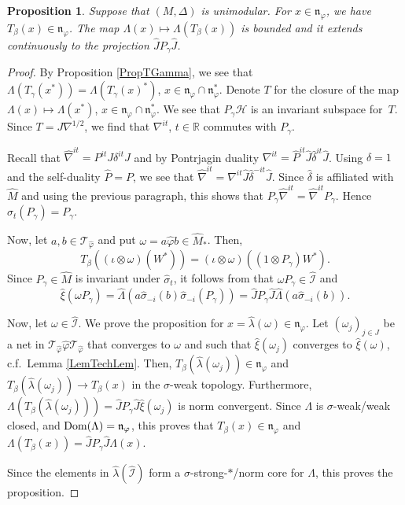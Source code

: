 \documentclass[11pt]{article}
\numberwithin{equation}{section}
\newtheorem{prop}[thm]{Proposition}
\theoremstyle{definition}
\newcommand{\cHil}{\mathcal{H}}
\newcommand{\nphi}{\mathfrak{n}_\varphi}
\newcommand{\Dom}{\text{\rm Dom}}
\begin{document}
\begin{prop}\label{PropTBeta}
Suppose that $(M, \Delta)$ is unimodular. For $x \in \nphi$, we have $T_\beta(x) \in \nphi$. The map $\Lambda(x) \mapsto \Lambda(T_\beta(x))$ is bounded and it extends continuously to the projection $\hat{J} P_\gamma \hat{J}$.
\end{prop}
\begin{proof}
By Proposition \ref{PropTGamma}, we see that $\Lambda(T_\gamma(x^\ast)) = \Lambda(T_\gamma(x)^\ast)$, $x \in \nphi \cap \nphi^\ast$. Denote $T$ for the closure of the map $\Lambda(x) \mapsto \Lambda(x^\ast)$, $x \in \nphi \cap \nphi^\ast$. We see that $P_\gamma \cHil$ is an invariant subspace for~$T$. Since $T = J \nabla^{1/2}$, we f\/ind that $\nabla^{it}$, $t \in \mathbb{R}$ commutes with $P_\gamma$.

Recall \cite[Lemma 8.8, Proposition 8.9]{KusVae} that $\hat{\nabla}^{it} =  P^{it} J \delta^{it} J$ and by Pontrjagin duality  $\nabla^{it} =  \hat{P}^{it} \hat{J} \hat{\delta}^{it} \hat{J}$. Using $\delta = 1$ and the self-duality $\hat{P} = P$, we see that $\hat{\nabla}^{it} =  \nabla^{it} \hat{J} \hat{\delta}^{-it} \hat{J}$. Since $\hat{\delta}$ is af\/f\/iliated with $\hat{M}$ and using the previous paragraph, this shows that $P_\gamma \hat{\nabla}^{it} = \hat{\nabla}^{it} P_\gamma$. Hence $\hat{\sigma}_t (P_\gamma) = P_\gamma$.

Now, let $a, b \in \mathcal{T}_{\hat{\varphi}}$ and put $\omega = a\hat{ \varphi} b \in \hat{M}_\ast$. Then,
\[
T_\beta\left( (\iota \otimes \omega)(W^\ast) \right) = (\iota \otimes \omega)\left( (1 \otimes P_\gamma) W^\ast \right).
\]
Since $P_\gamma \in \hat{M}$ is invariant under $\hat{\sigma}_t$, it follows from \cite[Chapter VIII, Lemma 2.4 (ii) and Lemma 2.5]{TakII} that $\omega P_\gamma \in \hat{\mathcal{I}}$ and
\[
\hat{\xi}(\omega P_\gamma ) = \hat{\Lambda}(a \hat{\sigma}_{-i}(b) \hat{\sigma}_{-i}(P_\gamma))  = \hat{J} P_\gamma \hat{J} \hat{\Lambda}(a \hat{\sigma}_{-i}(b) ).
\]

Now, let $\omega \in \hat{\mathcal{I}}$. We prove the proposition for $x = \hat{\lambda}(\omega) \in \nphi$. Let $(\omega_j)_{j \in J}$ be a net in $\mathcal{T}_{\hat{\varphi}} \hat{\varphi} \mathcal{T}_{\hat{\varphi}}$ that converges to $\omega$ and such that $\hat{\xi}(\omega_j)$ converges to $\hat{\xi}(\omega)$, c.f.\ Lemma \ref{LemTechLem}. Then, $T_\beta(\hat{\lambda}(\omega_j)) \in \nphi$ and  $T_\beta(\hat{\lambda}(\omega_j)) \rightarrow T_\beta(x)$ in the $\sigma$-weak topology. Furthermore, $\Lambda(T_\beta(\hat{\lambda}(\omega_j))) = \hat{J} P_\gamma \hat{J}\hat{\xi}(\omega_j)$ is norm convergent. Since $\Lambda$ is $\sigma$-weak/weak closed, and $\Dom(\Lambda) = \nphi$, this proves that $T_\beta(x) \in \nphi$ and $\Lambda(T_\beta(x)) =   \hat{J} P_\gamma \hat{J} \Lambda(x)$.

 Since the elements in $\hat{\lambda}(\hat{\mathcal{I}})$ form a $\sigma$-strong-$\ast$/norm core for $\Lambda$, this proves the proposition.
\end{proof}
\end{document}
